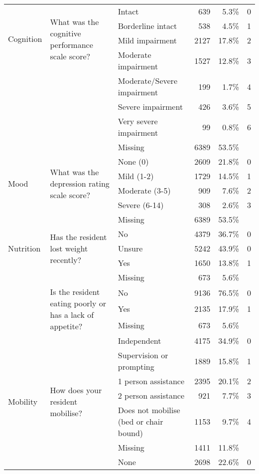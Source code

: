 \documentclass{article}
\begin{document}
\begin{table}[htbp]
\begin{tabularx}{\textwidth}{@{}lXlrrc@{}}
\midrule
\multirow{4}{*}{Cognition} & \multirow{4}{=}{What was the cognitive performance scale score?} & Intact & 639 & 5.3\% & 0 \\
 & & Borderline intact & 538 & 4.5\% & 1 \\
 & & Mild impairment & 2127 & 17.8\% & 2 \\
 & & Moderate impairment & 1527 & 12.8\% & 3 \\
 & & Moderate/Severe impairment & 199 & 1.7\% & 4 \\
 & & Severe impairment & 426 & 3.6\% & 5 \\
 & & Very severe impairment & 99 & 0.8\% & 6 \\
 & & Missing & 6389 & 53.5\% &  \\
\midrule
\multirow{4}{*}{Mood} & \multirow{4}{=}{What was the depression rating scale score?} & None (0) & 2609 & 21.8\% & 0 \\
 & & Mild (1-2) & 1729 & 14.5\% & 1 \\
 & & Moderate (3-5) & 909 & 7.6\% & 2 \\
 & & Severe (6-14) & 308 & 2.6\% & 3 \\
 & & Missing & 6389 & 53.5\% &  \\
\midrule
\multirow{3}{*}{Nutrition} & \multirow{3}{=}{Has the resident lost weight recently?} & No & 4379 & 36.7\% & 0 \\
 & & Unsure & 5242 & 43.9\% & 0 \\
 & & Yes & 1650 & 13.8\% & 1 \\
 & & Missing & 673 & 5.6\% &  \\
\cmidrule(l){2-6}
 & \multirow{3}{=}{Is the resident eating poorly or has a lack of appetite?} & No & 9136 & 76.5\% & 0 \\
 & & Yes & 2135 & 17.9\% & 1 \\
 & & Missing & 673 & 5.6\% &  \\
\midrule
\multirow{7}{*}{Mobility} & \multirow{7}{=}{How does your resident mobilise?} & Independent & 4175 & 34.9\% & 0 \\
  & & Supervision or prompting & 1889 & 15.8\% & 1 \\
 & & 1 person assistance & 2395 & 20.1\% & 2 \\
 & & 2 person assistance & 921 & 7.7\% & 3 \\
 & & Does not mobilise (bed or chair bound) & 1153 & 9.7\% & 4 \\
 & & Missing & 1411 & 11.8\% &  \\
\cmidrule(l){2-6}
 & \multirow{7}{=}{What equipment does your resident use to mobilise safely?} & None & 2698 & 22.6\% & 0 \\

\end{tabularx}
\end{table}
\end{document}
